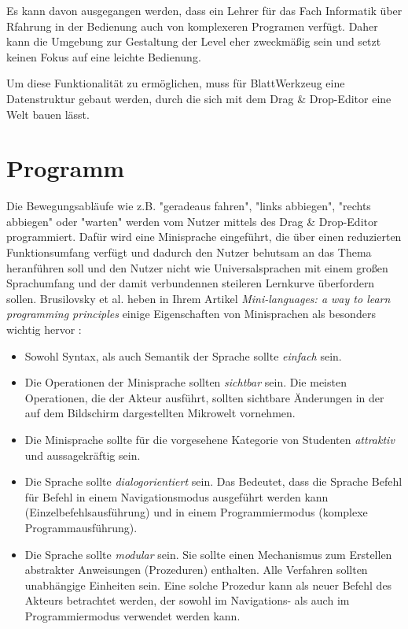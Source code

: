 Es kann davon ausgegangen werden, dass ein Lehrer für das Fach Informatik über Rfahrung in der Bedienung auch von komplexeren Programen verfügt. Daher kann die Umgebung zur Gestaltung der Level eher zweckmäßig sein und setzt keinen Fokus auf eine leichte Bedienung.

Um diese Funktionalität zu ermöglichen, muss für BlattWerkzeug eine Datenstruktur gebaut werden, durch die sich mit dem Drag \& Drop-Editor eine Welt bauen lässt.

\section{Programm}
\label{sec:requirements:program}

Die Bewegungsabläufe wie z.B. "geradeaus fahren", "links abbiegen", "rechts abbiegen" oder "warten" werden vom Nutzer mittels des Drag \& Drop-Editor programmiert. Dafür wird eine Minisprache eingeführt, die über einen reduzierten Funktionsumfang verfügt und dadurch den Nutzer behutsam an das Thema heranführen soll und den Nutzer nicht wie Universalsprachen mit einem großen Sprachumfang und der damit verbundennen steileren Lernkurve überfordern sollen. Brusilovsky et al. heben in Ihrem Artikel \textit{Mini-languages: a way to learn programming principles} einige Eigenschaften von Minisprachen als besonders wichtig hervor \cite[73-74]{brusilovsky1997}:

\begin{itemize}
    \item Sowohl Syntax, als auch Semantik der Sprache sollte \emph{einfach} sein.
    \item Die Operationen der Minisprache sollten \emph{sichtbar} sein. Die meisten Operationen, die der Akteur ausführt, sollten sichtbare Änderungen in der auf dem Bildschirm dargestellten Mikrowelt vornehmen.
    \item Die Minisprache sollte für die vorgesehene Kategorie von Studenten \emph{attraktiv} und aussagekräftig sein.
    \item Die Sprache sollte \emph{dialogorientiert} sein. Das Bedeutet, dass die Sprache Befehl für Befehl in einem Navigationsmodus ausgeführt werden kann (Einzelbefehlsausführung) und in einem Programmiermodus (komplexe Programmausführung).
    \item Die Sprache sollte \emph{modular} sein. Sie sollte einen Mechanismus zum Erstellen abstrakter Anweisungen (Prozeduren) enthalten. Alle Verfahren sollten unabhängige Einheiten sein. Eine solche Prozedur kann als neuer Befehl des Akteurs betrachtet werden, der sowohl im Navigations- als auch im Programmiermodus verwendet werden kann.
\end{itemize}

